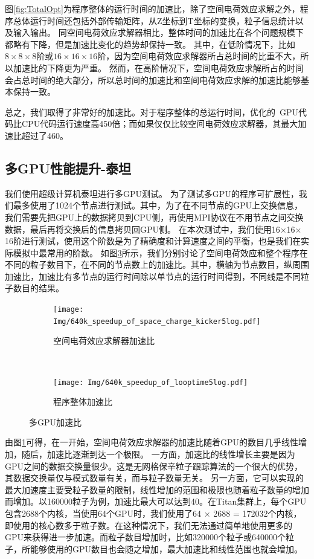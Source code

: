 图\ref{fig:TotalOpt}为程序整体的运行时间的加速比，除了空间电荷效应求解之外，程序总体运行时间还包括外部传输矩阵，从Z坐标到T坐标的变换，粒子信息统计以及输入输出。
同空间电荷效应求解器相比，整体时间的加速比在各个问题规模下都略有下降，但是加速比变化的趋势却保持一致。
其中，在低阶情况下，比如$8\times8\times8$阶或$16\times16\times16$阶，因为空间电荷效应求解器所占总时间的比重不大，所以加速比的下降更为严重。
然而，在高阶情况下，空间电荷效应求解所占的时间会占总时间的绝大部分，所以总时间的加速比和空间电荷效应求解的加速比能够基本保持一致。

总之，我们取得了非常好的加速比。对于程序整体的总运行时间，优化的~GPU代码比CPU代码运行速度高450倍；而如果仅仅比较空间电荷效应求解器，其最大加速比超过了460。

\subsection{多GPU性能提升-泰坦}
我们使用超级计算机泰坦进行多GPU测试。
为了测试多GPU的程序可扩展性，我们最多使用了1024个节点进行测试。其中，为了在不同节点的GPU上交换信息，我们需要先把GPU上的数据拷贝到CPU侧，再使用MPI协议在不用节点之间交换数据，最后再将交换后的信息拷贝回GPU侧。
在本次测试中，我们使用16$\times$16$\times$16阶进行测试，使用这个阶数是为了精确度和计算速度之间的平衡，也是我们在实际模拟中最常用的阶数。
如图\ref{fig:Titan}所示，我们分别讨论了空间电荷效应和整个程序在不同的粒子数目下，在不同的节点数上的加速比。其中，横轴为节点数目，纵周围加速比，加速比有多节点的运行时间除以单节点的运行时间得到，不同线是不同粒子数目的结果。

\begin{figure}[!htb]
    \centering
    \begin{subfigure}[b]{0.9\textwidth}
        \texttt{[image: Img/640k\_speedup\_of\_space\_charge\_kicker5log.pdf]}
        \caption{空间电荷效应求解器加速比}
        \label{fig:SCTitan}
    \end{subfigure}
    \quad
    ~ %
    \begin{subfigure}[b]{0.9\textwidth}
        \texttt{[image: Img/640k\_speedup\_of\_looptime5log.pdf]}
        \caption{程序整体加速比}
        \label{fig:TotalTitan}
    \end{subfigure}
    \caption{多GPU加速比}\label{fig:Titan}
\end{figure}

由图\ref{fig:SCTitan}可得，在一开始，空间电荷效应求解器的加速比随着GPU的数目几乎线性增加，随后，加速比逐渐到达一个极限。
一方面，加速比的线性增长主要是因为GPU之间的数据交换量很少。这是无网格保辛粒子跟踪算法的一个很大的优势，其数据交换量仅与模式数量有关，而与粒子数量无关。
另一方面，它可以实现的最大加速度主要受粒子数量的限制，线性增加的范围和极限也随着粒子数量的增加而增加。以160000粒子为例，加速比最大可以达到40。在Titan集群上，每个GPU包含2688个内核，当使用64个GPU时，我们使用了64 $\times$ 2688 = 172032个内核，即使用的核心数多于粒子数。在这种情况下，我们无法通过简单地使用更多的GPU来获得进一步加速。而粒子数目增加时，比如320000个粒子或640000个粒子，所能够使用的GPU数目也会随之增加，最大加速比和线性范围也就会增加。

